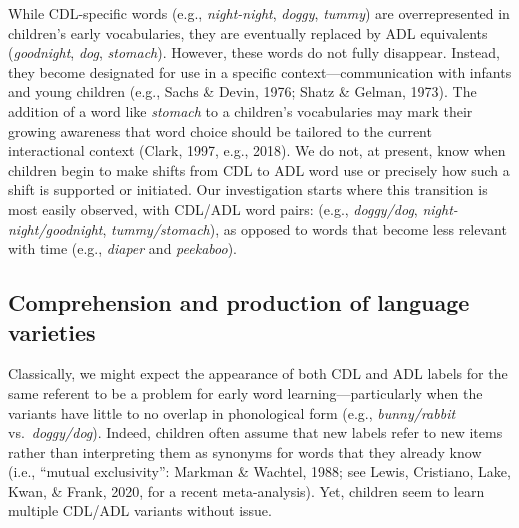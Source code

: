 \documentclass[10pt, letterpaper]{article}
\begin{document}
While CDL-specific words (e.g., \emph{night-night}, \emph{doggy},
\emph{tummy}) are overrepresented in children's early vocabularies, they
are eventually replaced by ADL equivalents (\emph{goodnight},
\emph{dog}, \emph{stomach}). However, these words do not fully
disappear. Instead, they become designated for use in a specific
context---communication with infants and young children (e.g., Sachs \&
Devin, 1976; Shatz \& Gelman, 1973). The addition of a word like
\emph{stomach} to a children's vocabularies may mark their growing
awareness that word choice should be tailored to the current
interactional context (Clark, 1997, e.g., 2018). We do not, at present,
know when children begin to make shifts from CDL to ADL word use or
precisely how such a shift is supported or initiated. Our investigation
starts where this transition is most easily observed, with CDL/ADL word
pairs: (e.g., \emph{doggy/dog}, \emph{night-night/goodnight},
\emph{tummy/stomach}), as opposed to words that become less relevant
with time (e.g., \emph{diaper} and \emph{peekaboo}).

\hypertarget{comprehension-and-production-of-language-varieties}{%
\subsection{Comprehension and production of language
varieties}\label{comprehension-and-production-of-language-varieties}}

Classically, we might expect the appearance of both CDL and ADL labels
for the same referent to be a problem for early word
learning---particularly when the variants have little to no overlap in
phonological form (e.g., \emph{bunny/rabbit} vs.~\emph{doggy/dog}).
Indeed, children often assume that new labels refer to new items rather
than interpreting them as synonyms for words that they already know
(i.e., {``mutual exclusivity''}: Markman \& Wachtel, 1988; see Lewis,
Cristiano, Lake, Kwan, \& Frank, 2020, for a recent meta-analysis). Yet,
children seem to learn multiple CDL/ADL variants without issue.
\end{document}
